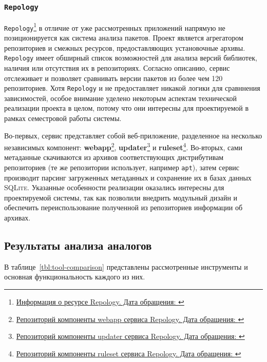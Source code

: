 \subsubsection{\texttt{Repology}}
\texttt{Repology}\footnote{\href{https://repology.org/docs/about}{Информация о ресурсе Repology. Дата обращения: }} в отличие от уже рассмотренных приложений напрямую не позиционируется как система анализа пакетов.
Проект является агрегатором репозиториев и смежных ресурсов, предоставляющих установочные архивы. \texttt{Repology} имеет обширный список возможностей для анализа версий библиотек, наличия или отсутствия их в репозиториях.
Согласно описанию, сервис отслеживает и позволяет сравнивать версии пакетов из более чем 120 репозиториев.
Хотя \texttt{Repology} и не предоставляет никакой логики для сравннения зависимостей, особое внимание уделено некоторым аспектам технической реализации проекта в целом, потому что они интересны для проектируемой в рамках семестровой работы системы.

Во-первых, сервис представляет собой веб-приложение, разделенное на несколько независимых компонент: \textbf{webapp}\footnote{\href{https://github.com/repology/repology-webapp}{Репозиторий компоненты webapp сервиса Repology. Дата обращения: }}, \textbf{updater}\footnote{\href{https://github.com/repology/repology-webapp}{Репозиторий компоненты updater сервиса Repology. Дата обращения: }} и \textbf{ruleset}\footnote{\href{https://github.com/repology/repology-webapp}{Репозиторий компоненты ruleset сервиса Repology. Дата обращения: }}.
Во-вторых, сами метаданные скачиваются из архивов соответствующих дистрибутивам репозиториев (те же репозитории использует, например \texttt{apt}), затем сервис производит парсинг загруженных метаданных и сохранение их в базах данных \textsc{SQLite}.
Указанные особенности реализации оказались интересны для проектируемой системы, так как позволили внедрить модульный дизайн и обеспечить переиспользование полученной из репозиториев информации об архивах.

\subsection{Результаты анализа аналогов}
В таблице~\ref{tbl:tool-comparison} представлены рассмотренные инструменты и основная функциональность каждого из них.

